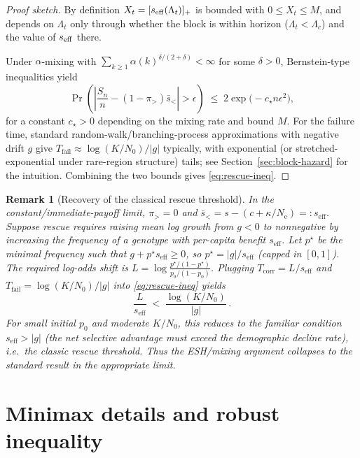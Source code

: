 \documentclass[11pt]{article}
\theoremstyle{upright}
\newtheorem{remark}{Remark}
\newcommand{\Ne}{N_{\mathrm{e}}}
\newcommand{\seff}[1][]{s_{\mathrm{eff}\if\relax\detokenize{#1}\relax\else,#1\fi}}
\begin{document}
\begin{proof}[Proof sketch]
By definition $X_t=[\seff(\Lambda_t)]_+$ is bounded with $0\le X_t\le M$,
and depends on $\Lambda_t$ only through whether the block is within horizon ($\Lambda_t<\Lambda_c$) and the value of $\seff$ there.

Under $\alpha$-mixing with $\sum_{k\ge1}\alpha(k)^{\delta/(2+\delta)}<\infty$ for some $\delta>0$, Bernstein-type inequalities yield
\[
\Pr\!\left(\left|\frac{S_n}{n}-(1-\pi_{>})\bar s_{<}\right|>\epsilon\right)\;\le\; 2\exp\!\Big(-c_\star n\epsilon^2\Big),
\]
for a constant $c_\star>0$ depending on the mixing rate and bound $M$. For the failure time, standard random-walk/branching-process approximations with negative drift $g$ give $T_{\mathrm{fail}}\approx \log(K/N_0)/|g|$ typically, with exponential (or stretched-exponential under rare-region structure) tails; see Section~\ref{sec:block-hazard} for the intuition. Combining the two bounds gives \eqref{eq:rescue-ineq}.


\end{proof}

\begin{remark}[Recovery of the classical rescue threshold]
In the constant/immediate-payoff limit, $\pi_{>}=0$ and $\bar s_{<}=s-(c+\kappa/\Ne)=:s_{\mathrm{eff}}$. Suppose rescue requires raising mean log growth from $g<0$ to nonnegative by increasing the frequency of a genotype with per-capita benefit $s_{\mathrm{eff}}$. Let $p^\star$ be the minimal frequency such that $g+p^\star s_{\mathrm{eff}}\ge 0$, so $p^\star=|g|/s_{\mathrm{eff}}$ (capped in $[0,1]$).
The required log-odds shift is $L=\log\!\frac{p^\star/(1-p^\star)}{p_0/(1-p_0)}$. Plugging $T_{\mathrm{corr}}=L/s_{\mathrm{eff}}$ and $T_{\mathrm{fail}}=\log(K/N_0)/|g|$ into \eqref{eq:rescue-ineq} yields
\[
\frac{L}{s_{\mathrm{eff}}} \;<\; \frac{\log(K/N_0)}{|g|}\,.
\]
For small initial $p_0$ and moderate $K/N_0$, this reduces to the familiar condition $s_{\mathrm{eff}}>|g|$ (the net selective advantage must exceed the demographic decline rate), i.e.\ the classic rescue threshold. Thus the ESH/mixing argument collapses to the standard result in the appropriate limit.
\end{remark}

\section{Minimax details and robust inequality}
\label{sec:minimax-details}
\end{document}
